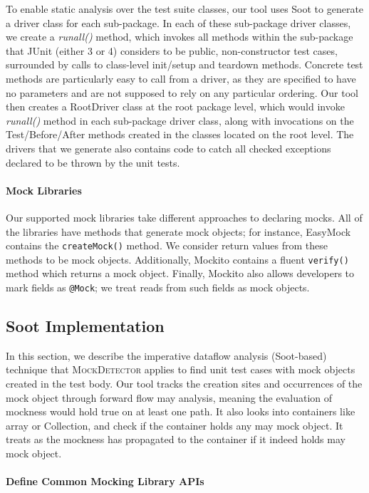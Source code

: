 To enable static analysis over the test suite classes, our tool uses Soot to generate a driver class for each sub-package. In each of these sub-package driver classes, we create a \textit{runall()} method, which invokes all methods within the sub-package that JUnit (either 3 or 4) considers to be public, non-constructor test cases, surrounded by calls to class-level init/setup and teardown methods. Concrete test methods are particularly easy to call from a driver, as they are specified to have no parameters and are not supposed to rely on any particular ordering. 
Our tool then creates a RootDriver class at the root package level, which would invoke \textit{runall()} method in each sub-package driver class, along with invocations on the Test/Before/After methods created in the classes located on the root level. The drivers that we generate also contains code to catch all checked exceptions declared to be thrown by the unit tests.

\paragraph{Mock Libraries}
Our supported mock libraries take different approaches to declaring mocks. All of the libraries have methods that generate mock objects; for instance, EasyMock contains the \texttt{createMock()} method. We consider return values from these methods to be mock objects. Additionally, Mockito contains a fluent \texttt{verify()} method which returns a mock object. Finally, Mockito also allows developers to mark fields as \texttt{@Mock}; we treat reads from such fields as mock objects.

\subsection{Soot Implementation}
In this section, we describe the imperative dataflow analysis (Soot-based) technique that \textsc{MockDetector} applies to find unit test cases with mock objects created in the test body. Our tool tracks the creation sites and occurrences of the mock object through forward flow may analysis, meaning the evaluation of mockness would hold true on at least one path. It also looks into containers like array or Collection, and check if the container holds any may mock object. It treats as the mockness has propagated to the container if it indeed holds may mock object.

\paragraph{Define Common Mocking Library APIs}
\label{subsubsec:collection}

